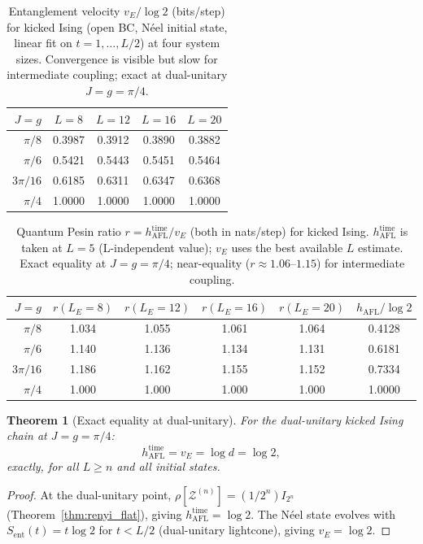 \documentclass[12pt,a4paper]{article}
\newtheorem{theorem}{Theorem}[section]
\begin{document}
\begin{table}[h!]
\centering
\caption{Entanglement velocity $v_E/\log 2$ (bits/step) for kicked Ising
(open BC, N\'eel initial state, linear fit on $t=1,\ldots,L/2$) at
four system sizes.  Convergence is visible but slow for intermediate
coupling; exact at dual-unitary $J{=}g{=}\pi/4$.}
\label{tab:vE_L}
\begin{tabular}{r|cccc}
\hline
$J=g$ & $L=8$ & $L=12$ & $L=16$ & $L=20$ \\
\hline
$\pi/8$   & 0.3987 & 0.3912 & 0.3890 & 0.3882 \\
$\pi/6$   & 0.5421 & 0.5443 & 0.5451 & 0.5464 \\
$3\pi/16$ & 0.6185 & 0.6311 & 0.6347 & 0.6368 \\
$\pi/4$   & 1.0000 & 1.0000 & 1.0000 & 1.0000 \\
\hline
\end{tabular}
\end{table}

\begin{table}[h!]
\centering
\caption{Quantum Pesin ratio $r = h_{\mathrm{AFL}}^{\mathrm{time}} / v_E$
(both in nats/step) for kicked Ising.
$h_{\mathrm{AFL}}^{\mathrm{time}}$ is taken at $L=5$ (L-independent
value); $v_E$ uses the best available $L$ estimate.
Exact equality at $J{=}g{=}\pi/4$; near-equality ($r \approx 1.06$--$1.15$)
for intermediate coupling.}
\label{tab:ratio_r}
\begin{tabular}{r|cccc|c}
\hline
$J=g$ & $r(L_E=8)$ & $r(L_E=12)$ & $r(L_E=16)$ & $r(L_E=20)$
      & $h_{\mathrm{AFL}}/\log 2$ \\
\hline
$\pi/8$   & 1.034 & 1.055 & 1.061 & 1.064 & 0.4128 \\
$\pi/6$   & 1.140 & 1.136 & 1.134 & 1.131 & 0.6181 \\
$3\pi/16$ & 1.186 & 1.162 & 1.155 & 1.152 & 0.7334 \\
$\pi/4$   & 1.000 & 1.000 & 1.000 & 1.000 & 1.0000 \\
\hline
\end{tabular}
\end{table}

\begin{theorem}[Exact equality at dual-unitary]
  \label{thm:qp_exact_du_2}
  For the dual-unitary kicked Ising chain at $J{=}g{=}\pi/4$:
  \[
    h_{\mathrm{AFL}}^{\mathrm{time}} = v_E = \log d = \log 2,
  \]
  exactly, for all $L \geq n$ and all initial states.
\end{theorem}

\begin{proof}
  At the dual-unitary point, $\rho[\mathcal{Z}^{(n)}] = (1/2^n)I_{2^n}$
  (Theorem~\ref{thm:renyi_flat}), giving $h_{\mathrm{AFL}}^{\mathrm{time}}
  = \log 2$.  The N\'eel state evolves with $S_{\mathrm{ent}}(t) = t\log 2$
  for $t < L/2$ (dual-unitary lightcone), giving $v_E = \log 2$.
\end{proof}
\end{document}
